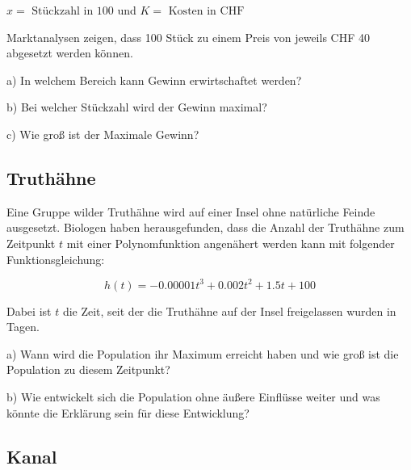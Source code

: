 $x = \text{ Stückzahl in 100}$ und $K = \text{ Kosten in CHF}$

Marktanalysen zeigen, dass 100 Stück zu einem Preis von jeweils CHF 40
abgesetzt werden können.

a) In welchem Bereich kann Gewinn erwirtschaftet werden?

b) Bei welcher Stückzahl wird der Gewinn maximal?

c) Wie groß ist der Maximale Gewinn?



\subsection{Truthähne}
Eine Gruppe wilder Truthähne wird auf einer Insel ohne natürliche Feinde ausgesetzt. Biologen haben
herausgefunden, dass die Anzahl der Truthähne zum Zeitpunkt $t$ mit
einer Polynomfunktion angenähert werden kann mit folgender
Funktionsgleichung:

$$h(t) = -0.00001 t^3 + 0.002 t^2 + 1.5t + 100$$

Dabei ist $t$ die Zeit, seit der die Truthähne auf der Insel freigelassen wurden in Tagen.

a)
Wann wird die Population ihr Maximum erreicht haben und wie groß ist die Population zu
diesem Zeitpunkt?

b)
Wie entwickelt sich die Population ohne äußere Einflüsse weiter und was könnte die Erklärung
sein für diese Entwicklung?


\subsection{Kanal}

